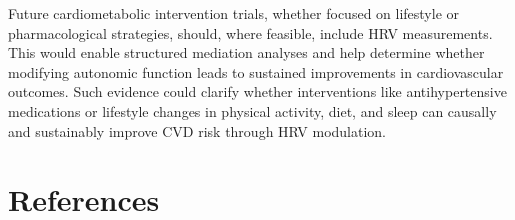 \documentclass[
  a4paper,
  headsepline=true,
  open=any]{scrbook}
\begin{document}
Future cardiometabolic intervention trials, whether focused on lifestyle
or pharmacological strategies, should, where feasible, include HRV
measurements. This would enable structured mediation analyses and help
determine whether modifying autonomic function leads to sustained
improvements in cardiovascular outcomes. Such evidence could clarify
whether interventions like antihypertensive medications or lifestyle
changes in physical activity, diet, and sleep can causally and
sustainably improve CVD risk through HRV modulation.


\hypertarget{references}{%
\chapter*{References}\label{references}}

\end{document}
